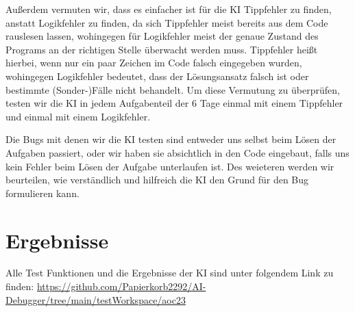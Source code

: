 \documentclass[a4paper,12pt,ngerman]{scrartcl}
\begin{document}
Außerdem vermuten wir, dass es einfacher ist für die KI Tippfehler zu finden, anstatt Logikfehler zu finden, da sich Tippfehler meist bereits aus dem Code rauslesen lassen, wohingegen für Logikfehler meist der genaue Zustand des Programs an der richtigen Stelle überwacht werden muss. Tippfehler heißt hierbei, wenn nur ein paar Zeichen im Code falsch eingegeben wurden, wohingegen Logikfehler bedeutet, dass der Lösungsansatz falsch ist oder bestimmte (Sonder-)Fälle nicht behandelt. Um diese Vermutung zu überprüfen, testen wir die KI in jedem Aufgabenteil der 6 Tage einmal mit einem Tippfehler und einmal mit einem Logikfehler.

Die Bugs mit denen wir die KI testen sind entweder uns selbst beim Lösen der Aufgaben passiert, oder wir haben sie absichtlich in den Code eingebaut, falls uns kein Fehler beim Lösen der Aufgabe unterlaufen ist. Des weieteren werden wir beurteilen, wie verständlich und hilfreich die KI den Grund für den Bug formulieren kann.

\section{Ergebnisse}

Alle Test Funktionen und die Ergebnisse der KI sind unter folgendem Link zu finden: \url{https://github.com/Papierkorb2292/AI-Debugger/tree/main/testWorkspace/aoc23}
\end{document}
